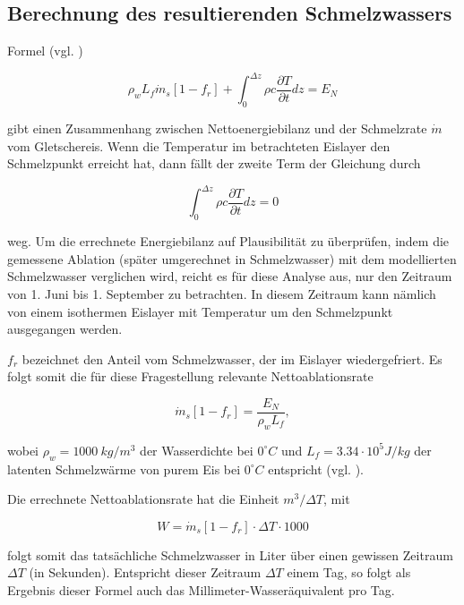 \documentclass[11pt,a4paper]{article}
\begin{document}
\subsection{Berechnung des resultierenden Schmelzwassers}\label{Section Berechnung Schmelzwasser}
Formel (vgl. \cite[142]{ThePhysicsOfGlaciers})

\begin{equation}
\rho_{w} L_{f} \dot{m}_{s}\left[1-f_{r}\right]+\int_{0}^{\Delta z} \rho c \frac{\partial T}{\partial t} d z=E_{N}
\end{equation}


gibt einen Zusammenhang zwischen Nettoenergiebilanz und der Schmelzrate $\dot{m}$ vom Gletschereis. Wenn die Temperatur im betrachteten Eislayer den Schmelzpunkt erreicht hat, dann fällt der zweite Term der Gleichung durch


\begin{equation}
\int_{0}^{\Delta z} \rho c \frac{\partial T}{\partial t} d z=0
\end{equation}

weg. Um die errechnete Energiebilanz auf Plausibilität zu überprüfen, indem die gemessene Ablation (später umgerechnet in Schmelzwasser) mit dem modellierten Schmelzwasser verglichen wird, reicht es für diese Analyse aus, nur den Zeitraum von 1. Juni bis 1. September zu betrachten. In diesem Zeitraum kann nämlich von einem isothermen Eislayer mit Temperatur um den Schmelzpunkt ausgegangen werden.

$f_r$ bezeichnet den Anteil vom Schmelzwasser, der im Eislayer wiedergefriert. Es folgt somit die für diese Fragestellung relevante Nettoablationsrate 

\begin{equation}
\dot{m}_{s}\left[1-f_{r}\right]=\frac{E_{N}}{\rho_{w} L_{f}},
\end{equation}

wobei $\rho_{w}=1000~kg/m^{3}$ der Wasserdichte bei $0^\circ C$ und $L_{f}=3.34 \cdot 10^5 J/kg$ der latenten Schmelzwärme von purem Eis bei $0^\circ C$ entspricht (vgl. \cite[142]{ThePhysicsOfGlaciers}).

Die errechnete Nettoablationsrate hat die Einheit $m^3/\Delta T$, mit

\begin{equation}
W = \dot{m}_{s}\left[1-f_{r}\right] \cdot \Delta T \cdot 1000
\end{equation}


folgt somit das tatsächliche Schmelzwasser in Liter über einen gewissen Zeitraum $\Delta T$ (in Sekunden). Entspricht dieser Zeitraum $\Delta T$ einem Tag, so folgt als Ergebnis dieser Formel auch das Millimeter-Wasseräquivalent pro Tag.\\
\end{document}
